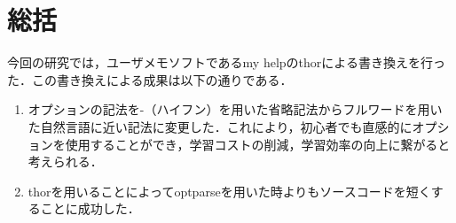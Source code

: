 \chapter{総括}\label{ux7dcfux62ec}

今回の研究では，ユーザメモソフトであるmy
helpのthorによる書き換えを行った．この書き換えによる成果は以下の通りである．

\begin{enumerate}
\def\labelenumi{\arabic{enumi}.}
\item
  オプションの記法を-（ハイフン）を用いた省略記法からフルワードを用いた自然言語に近い記法に変更した．これにより，初心者でも直感的にオプションを使用することができ，学習コストの削減，学習効率の向上に繋がると考えられる．
\item
  thorを用いることによってoptparseを用いた時よりもソースコードを短くすることに成功した．
\end{enumerate}

    